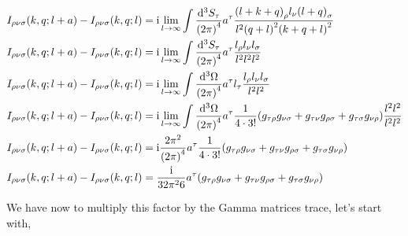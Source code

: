 \begin{align}
    I_{\rho\nu\sigma}\qty(k,q;l+a)-I_{\rho\nu\sigma}\qty(k,q;l)&=\textnormal{i}\lim\limits_{l\rightarrow\infty}\int\frac{\dd[3]{S_\tau}}{\qty(2\pi)^4}a^\tau\frac{\qty(l+k+q)_\rho l_\nu \qty(l+q)_\sigma}{l^2\qty(q+l)^2\qty(k+q+l)^2}\nonumber\\
    I_{\rho\nu\sigma}\qty(k,q;l+a)-I_{\rho\nu\sigma}\qty(k,q;l)&=\textnormal{i}\lim\limits_{l\rightarrow\infty}\int\frac{\dd[3]{S_\tau}}{\qty(2\pi)^4}a^\tau\frac{l_\rho l_\nu l_\sigma}{l^2l^2l^2}\nonumber\\
    I_{\rho\nu\sigma}\qty(k,q;l+a)-I_{\rho\nu\sigma}\qty(k,q;l)&=\textnormal{i}\lim\limits_{l\rightarrow\infty}\int\frac{\dd[3]{\Omega}}{\qty(2\pi)^4}a^\tau l_\tau\frac{l_\rho l_\nu l_\sigma}{l^2l^2}\nonumber\\
    I_{\rho\nu\sigma}\qty(k,q;l+a)-I_{\rho\nu\sigma}\qty(k,q;l)&=\textnormal{i}\lim\limits_{l\rightarrow\infty}\int\frac{\dd[3]{\Omega}}{\qty(2\pi)^4}a^\tau \frac{1}{4\cdot 3!}\qty(g_{\tau\rho}g_{\nu\sigma}+g_{\tau\nu}g_{\rho\sigma}+g_{\tau\sigma}g_{\nu\rho})\frac{l^2l^2}{l^2l^2}\nonumber\\
    I_{\rho\nu\sigma}\qty(k,q;l+a)-I_{\rho\nu\sigma}\qty(k,q;l)&=\textnormal{i}\frac{2\pi^2}{\qty(2\pi)^4}a^\tau \frac{1}{4\cdot 3!}\qty(g_{\tau\rho}g_{\nu\sigma}+g_{\tau\nu}g_{\rho\sigma}+g_{\tau\sigma}g_{\nu\rho})\nonumber\\
    I_{\rho\nu\sigma}\qty(k,q;l+a)-I_{\rho\nu\sigma}\qty(k,q;l)&=\frac{\textnormal{i}}{32\pi^26}a^\tau \qty(g_{\tau\rho}g_{\nu\sigma}+g_{\tau\nu}g_{\rho\sigma}+g_{\tau\sigma}g_{\nu\rho})\nonumber
\end{align}

We have now to multiply this factor by the Gamma matrices trace, let's start with,

